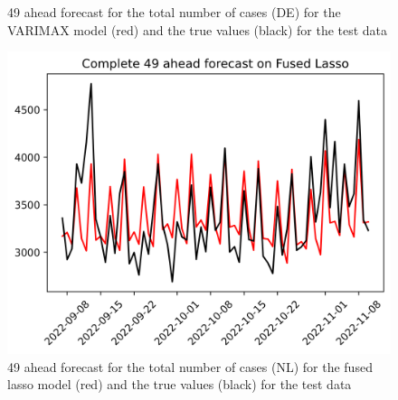 \begin{figure}
\begin{minipage}{.32\textwidth}
  \caption{49 ahead forecast for the total number of cases (DE) for the VARIMAX model (red) and the true values (black) for the test data}
  \label{fig:tot_cases_fc_49_VARIMAX_DE}
\end{minipage}
\begin{minipage}{.32\textwidth}
  \centering
  \includegraphics[width=\linewidth]{pics/49_ah/Complete_49_ahead_Fused Lasso.png}
  \caption{49 ahead forecast for the total number of cases (NL) for the fused lasso model (red) and the true values (black) for the test data}
  \label{fig:tot_cases_fc_49_flasso}
\end{minipage}

\end{figure}
